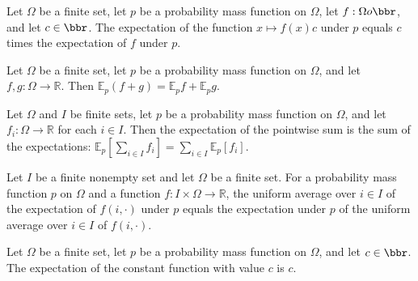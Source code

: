 \begin{theorem}
\label{FABL.pmfExpectation_mul_const}
\leanok
{}
Let $\Omega$ be a finite set, let $p$ be a probability mass function on $\Omega$, let
$f:\Omega	o\bbr$, and let $c\in\bbr$. The expectation of the function $x\mapsto f(x)c$
under $p$ equals $c$ times the expectation of $f$ under $p$.
\end{theorem}

\begin{theorem}
\label{FABL.pmfExpectation_add}
\leanok
{}
Let $\Omega$ be a finite set, let $p$ be a probability mass function on $\Omega$, and
let $f,g:\Omega\to\mathbb R$. Then $\mathbb E_p(f+g)=\mathbb E_p f+\mathbb E_p g$.
\end{theorem}

\begin{theorem}
\label{FABL.pmfExpectation_sum}
\leanok
{}
Let $\Omega$ and $I$ be finite sets, let $p$ be a probability mass function on $\Omega$,
and let $f_i:\Omega\to\mathbb{R}$ for each $i\in I$. Then the expectation of the
pointwise sum is the sum of the expectations: $\mathbb{E}_p[\sum_{i\in I}f_i]=\sum_{i\in
I}\mathbb{E}_p[f_i]$.
\end{theorem}

\begin{theorem}
\label{FABL.fintypeExpectation_pmfExpectation_comm}
\leanok
{}
Let $I$ be a finite nonempty set and let $\Omega$ be a finite set. For a probability mass
function $p$ on $\Omega$ and a function $f:I\times\Omega\to\mathbb R$, the uniform average
over $i\in I$ of the expectation of $f(i,\cdot)$ under $p$ equals the expectation under
$p$ of the uniform average over $i\in I$ of $f(i,\cdot)$.
\end{theorem}

\begin{theorem}
\label{FABL.pmfExpectation_const}
\leanok
{}
Let $\Omega$ be a finite set, let $p$ be a probability mass function on $\Omega$, and
let $c\in\bbr$. The expectation of the constant function with value $c$ is $c$.
\end{theorem}

